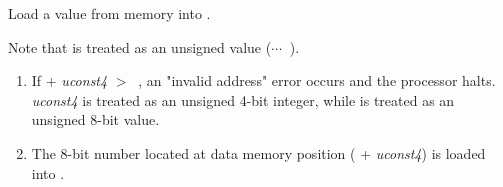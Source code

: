 


Load a value from memory into .

Note that  is treated as an unsigned value
		(\MinUIntWord $\cdots ~$ \MaxUIntWord).

\begin{enumerate}

\item If  + {\em uconst4} $> ~$ \MaxUIntWord,
	an "invalid address" error occurs and the processor halts.
	{\em uconst4} is treated
	as an unsigned 4-bit integer, while  is treated as
	an unsigned 8-bit value.

\item The 8-bit number located at data memory position
	( + {\em uconst4})
	is loaded into .

\end{enumerate}

